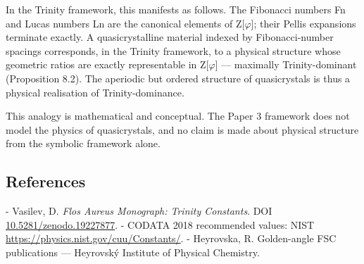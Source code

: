   In the Trinity framework, this manifests as follows. The Fibonacci numbers Fn and
  Lucas numbers Ln are the canonical elements of Z[$\varphi$]; their Pellis expansions terminate
  exactly. A quasicrystalline material indexed by Fibonacci-number spacings
  corresponds, in the Trinity framework, to a physical structure whose geometric ratios
  are exactly representable in Z[$\varphi$] --- maximally Trinity-dominant (Proposition 8.2). The
  aperiodic but ordered structure of quasicrystals is thus a physical realisation of
  Trinity-dominance.

  This analogy is mathematical and conceptual. The Paper 3 framework does not model
  the physics of quasicrystals, and no claim is made about physical structure from the
  symbolic framework alone.

\subsection{References}

- Vasilev, D. \textit{Flos Aureus Monograph: Trinity Constants}. DOI \href{https://zenodo.org/doi/10.5281/zenodo.19227877}{10.5281/zenodo.19227877}.
- CODATA 2018 recommended values: NIST \href{https://physics.nist.gov/cuu/Constants/}{https://physics.nist.gov/cuu/Constants/}.
- Heyrovska, R. Golden-angle FSC publications --- Heyrovský Institute of Physical Chemistry.
